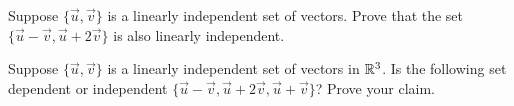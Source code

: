 \documentclass{ximera}
\begin{document}
\begin{problem}\label{prob:OtherLinearComb}
Suppose $\{{\vec{u}},{\vec{v}}\}$ is a linearly independent set of vectors.  Prove that the set $\{\vec{u} -\vec{v}, \vec{u}+2\vec{v}\}$ is also linearly independent.
\end{problem}

\begin{problem}\label{prob:OtherLinearComb2}
Suppose $\{{\vec{u}},{\vec{v}}\}$ is a linearly independent set of vectors in $\mathbb{R}^3$.  Is the following set dependent or independent $\{\vec{u} -\vec{v}, \vec{u}+2\vec{v}, \vec{u}+\vec{v}\}$? Prove your claim.
\end{problem}
\end{document}
